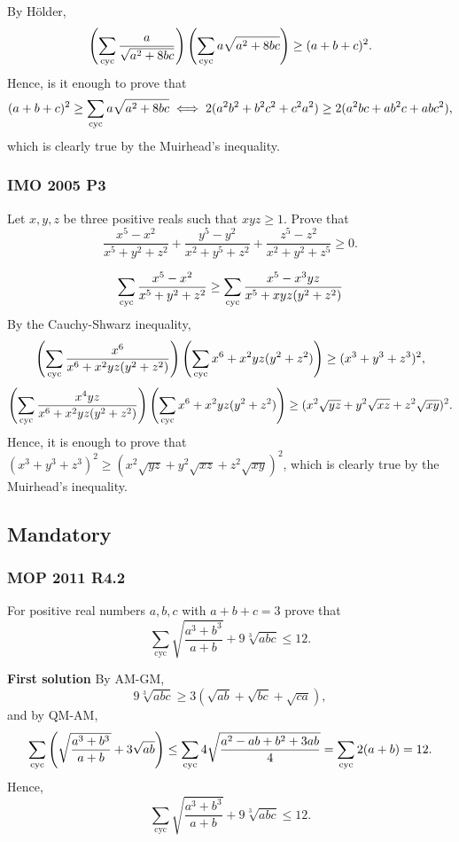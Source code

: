 \documentclass[12pt]{article}
\begin{document}
By Hölder,
\[
	\left(\sum_{\text{cyc}} \frac{a}{\sqrt{a^2+8bc}}\right)\left(\sum_{\text{cyc}} a \sqrt{a^2+8bc}\right) \geq (a+b+c)^2.
\]
Hence, is it enough to prove that
\[
	\displaystyle (a+b+c)^2 \geq \sum_{\text{cyc}} a \sqrt{a^2+8bc} \iff 2(a^2b^2 +b^2c^2 + c^2a^2) \geq 2(a^2bc + ab^2c + abc^2),
\]
which is clearly true by the Muirhead's inequality.
\clearpage

\subsubsection{IMO 2005 P3}
\begin{problem}
Let $x,y,z$ be three positive reals such that $xyz \geq 1$. Prove that
\[
	\frac { x^5-x^2 }{x^5+y^2+z^2} + \frac {y^5-y^2}{x^2+y^5+z^2} + \frac {z^5-z^2}{x^2+y^2+z^5} \geq 0.
\]
\end{problem}

\[
	\sum_{\text{cyc}} \frac{x^5-x^2}{x^5+y^2+z^2} \geq \sum_{\text{cyc}} \frac{x^5 -x^3yz}{x^5 +xyz(y^2+z^2)}
\]
By the Cauchy-Shwarz inequality,
\[
	\left(\sum_{\text{cyc}} \frac{x^6}{x^6+x^2yz(y^2+z^2)}\right)\left(\sum_{\text{cyc}} x^6+x^2yz(y^2+z^2)\right) \geq (x^3+y^3+z^3)^2,
\]
\[
	\left(\sum_{\text{cyc}} \frac{x^4yz}{x^6+x^2yz(y^2+z^2)}\right)\left(\sum_{\text{cyc}} x^6+x^2yz(y^2+z^2)\right) \geq (x^2\sqrt{yz} +y^2\sqrt{xz} + z^2\sqrt{xy})^2.
\]
Hence, it is enough to prove that $(x^3+y^3+z^3)^2 \geq \left(x^2\sqrt{yz} +y^2\sqrt{xz} + z^2\sqrt{xy}\right)^2$, which is clearly
true by the Muirhead's inequality.
\clearpage

\subsection{Mandatory}

\subsubsection{MOP 2011 R4.2}

\begin{problem}
For positive real numbers $a, b, c$ with $a + b + c = 3$ prove that
\[\sum_{\text{cyc}}\sqrt{\frac{a^3+b^3}{a+b}}+9\sqrt[3]{abc}\le12.\]
\end{problem}

\textbf{\textcolor{color1}{First solution}} By AM-GM,
\[
	9\sqrt[3]{abc} \ge 3(\sqrt{ab}+\sqrt{bc}+\sqrt{ca}),
\]
and by QM-AM,
\[
	\sum_{\text{cyc}} \left(\sqrt{\frac{a^3+b^3}{a+b}}+3\sqrt{ab}\right) \le \sum_{\text{cyc}} 4\sqrt{\frac{a^2-ab+b^2+3ab}{4}} = \sum_{\text{cyc}} 2(a+b) = 12.
\]
Hence,
\[\sum_{\text{cyc}}\sqrt{\frac{a^3+b^3}{a+b}}+9\sqrt[3]{abc}\le12.\]
\end{document}
